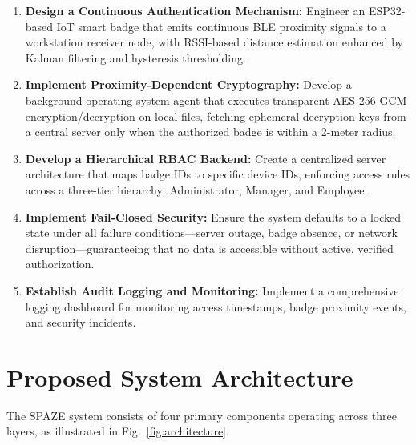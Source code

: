 \documentclass[conference]{IEEEtran}
\begin{document}
\begin{enumerate}[noitemsep]
    \item \textbf{Design a Continuous Authentication Mechanism:} Engineer an ESP32-based IoT smart badge that emits continuous BLE proximity signals to a workstation receiver node, with RSSI-based distance estimation enhanced by Kalman filtering and hysteresis thresholding.

    \item \textbf{Implement Proximity-Dependent Cryptography:} Develop a background operating system agent that executes transparent AES-256-GCM encryption/decryption on local files, fetching ephemeral decryption keys from a central server only when the authorized badge is within a 2-meter radius.

    \item \textbf{Develop a Hierarchical RBAC Backend:} Create a centralized server architecture that maps badge IDs to specific device IDs, enforcing access rules across a three-tier hierarchy: Administrator, Manager, and Employee.

    \item \textbf{Implement Fail-Closed Security:} Ensure the system defaults to a locked state under all failure conditions—server outage, badge absence, or network disruption—guaranteeing that no data is accessible without active, verified authorization.

    \item \textbf{Establish Audit Logging and Monitoring:} Implement a comprehensive logging dashboard for monitoring access timestamps, badge proximity events, and security incidents.
\end{enumerate}

\section{Proposed System Architecture}

The SPAZE system consists of four primary components operating across three layers, as illustrated in Fig.~\ref{fig:architecture}.
\end{document}
